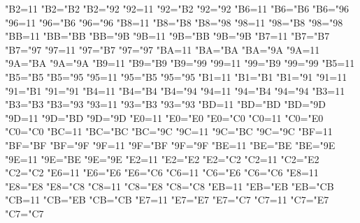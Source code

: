 {    \catcode"B2=11 \lccode"B2="B2 \uccode"B2="92 %
    \catcode"92=11 \lccode"92="B2 \uccode"92="92 %
    \catcode"B6=11 \lccode"B6="B6 \uccode"B6="96 %
    \catcode"96=11 \lccode"96="B6 \uccode"96="96 %
    \catcode"B8=11 \lccode"B8="B8 \uccode"B8="98 %
    \catcode"98=11 \lccode"98="B8 \uccode"98="98 %
    \catcode"BB=11 \lccode"BB="BB \uccode"BB="9B %
    \catcode"9B=11 \lccode"9B="BB \uccode"9B="9B %
    \catcode"B7=11 \lccode"B7="B7 \uccode"B7="97 %
    \catcode"97=11 \lccode"97="B7 \uccode"97="97 %
    \catcode"BA=11 \lccode"BA="BA \uccode"BA="9A %
    \catcode"9A=11 \lccode"9A="BA \uccode"9A="9A %
    \catcode"B9=11 \lccode"B9="B9 \uccode"B9="99 %
    \catcode"99=11 \lccode"99="B9 \uccode"99="99 %
    \catcode"B5=11 \lccode"B5="B5 \uccode"B5="95 %
    \catcode"95=11 \lccode"95="B5 \uccode"95="95 %
    \catcode"B1=11 \lccode"B1="B1 \uccode"B1="91 %
    \catcode"91=11 \lccode"91="B1 \uccode"91="91 %
    \catcode"B4=11 \lccode"B4="B4 \uccode"B4="94 %
    \catcode"94=11 \lccode"94="B4 \uccode"94="94 %
    \catcode"B3=11 \lccode"B3="B3 \uccode"B3="93 %
    \catcode"93=11 \lccode"93="B3 \uccode"93="93 %
    \catcode"BD=11 \lccode"BD="BD \uccode"BD="9D %
    \catcode"9D=11 \lccode"9D="BD \uccode"9D="9D %
    \catcode"E0=11 \lccode"E0="E0 \uccode"E0="C0 %
    \catcode"C0=11 \lccode"C0="E0 \uccode"C0="C0 %
    \catcode"BC=11 \lccode"BC="BC \uccode"BC="9C %
    \catcode"9C=11 \lccode"9C="BC \uccode"9C="9C %
    \catcode"BF=11 \lccode"BF="BF \uccode"BF="9F %
    \catcode"9F=11 \lccode"9F="BF \uccode"9F="9F %
    \catcode"BE=11 \lccode"BE="BE \uccode"BE="9E %
    \catcode"9E=11 \lccode"9E="BE \uccode"9E="9E %
    \catcode"E2=11 \lccode"E2="E2 \uccode"E2="C2 %
    \catcode"C2=11 \lccode"C2="E2 \uccode"C2="C2 %
    \catcode"E6=11 \lccode"E6="E6 \uccode"E6="C6 %
    \catcode"C6=11 \lccode"C6="E6 \uccode"C6="C6 %
    \catcode"E8=11 \lccode"E8="E8 \uccode"E8="C8 %
    \catcode"C8=11 \lccode"C8="E8 \uccode"C8="C8 %
    \catcode"EB=11 \lccode"EB="EB \uccode"EB="CB %
    \catcode"CB=11 \lccode"CB="EB \uccode"CB="CB %
    \catcode"E7=11 \lccode"E7="E7 \uccode"E7="C7 %
    \catcode"C7=11 \lccode"C7="E7 \uccode"C7="C7 %
}
